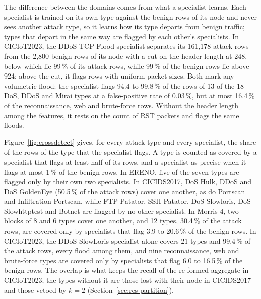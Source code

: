 The difference between the domains comes from what a specialist learns. Each specialist is trained on its own type against the benign rows of its node and never sees another attack type, so it learns how its type departs from benign traffic; types that depart in the same way are flagged by each other's specialists. In CICIoT2023, the DDoS TCP Flood specialist separates its 161,178 attack rows from the 2,800 benign rows of its node with a cut on the header length at 248, below which lie 99\,\% of its attack rows, while 99\,\% of the benign rows lie above 924; above the cut, it flags rows with uniform packet sizes. Both mark any volumetric flood: the specialist flags 94.4 to 99.8\,\% of the rows of 13 of the 18 DoS, DDoS and Mirai types at a false-positive rate of 0.03\,\%, but at most 16.4\,\% of the reconnaissance, web and brute-force rows. Without the header length among the features, it rests on the count of RST packets and flags the same floods.

Figure~\ref{fig:crossdetect} gives, for every attack type and every specialist, the share of the rows of the type that the specialist flags. A type is counted as covered by a specialist that flags at least half of its rows, and a specialist as precise when it flags at most 1\,\% of the benign rows. In ERENO, five of the seven types are flagged only by their own two specialists. In CICIDS2017, DoS Hulk, DDoS and DoS GoldenEye (50.5\,\% of the attack rows) cover one another, as do Portscan and Infiltration Portscan, while FTP-Patator, SSH-Patator, DoS Slowloris, DoS Slowhttptest and Botnet are flagged by no other specialist. In Morris-4, two blocks of 8 and 6 types cover one another, and 12 types, 30.4\,\% of the attack rows, are covered only by specialists that flag 3.9 to 20.6\,\% of the benign rows. In CICIoT2023, the DDoS SlowLoris specialist alone covers 21 types and 99.4\,\% of the attack rows, every flood among them, and nine reconnaissance, web and brute-force types are covered only by specialists that flag 6.0 to 16.5\,\% of the benign rows. The overlap is what keeps the recall of the re-formed aggregate in CICIoT2023; the types without it are those lost with their node in CICIDS2017 and those vetoed by $k{=}2$ (Section~\ref{sec:res-partition}).

